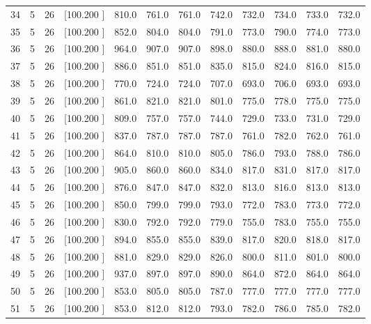 \documentclass[12pt,a4paper]{article}
\begin{document}
\begin{center}
{\begin{tabular}{r r r r r r r r r r r r}
  34&  5& 26&[100.200   ]&   810.0&   761.0&   761.0&   742.0&   732.0&   734.0&   733.0&   732.0\\[-0.02in]
  35&  5& 26&[100.200   ]&   852.0&   804.0&   804.0&   791.0&   773.0&   790.0&   774.0&   773.0\\[-0.02in]
  36&  5& 26&[100.200   ]&   964.0&   907.0&   907.0&   898.0&   880.0&   888.0&   881.0&   880.0\\[-0.02in]
  37&  5& 26&[100.200   ]&   886.0&   851.0&   851.0&   835.0&   815.0&   824.0&   816.0&   815.0\\[-0.02in]
  38&  5& 26&[100.200   ]&   770.0&   724.0&   724.0&   707.0&   693.0&   706.0&   693.0&   693.0\\[-0.02in]
  39&  5& 26&[100.200   ]&   861.0&   821.0&   821.0&   801.0&   775.0&   778.0&   775.0&   775.0\\[-0.02in]
  40&  5& 26&[100.200   ]&   809.0&   757.0&   757.0&   744.0&   729.0&   733.0&   731.0&   729.0\\[-0.02in]
  41&  5& 26&[100.200   ]&   837.0&   787.0&   787.0&   787.0&   761.0&   782.0&   762.0&   761.0\\[-0.02in]
  42&  5& 26&[100.200   ]&   864.0&   810.0&   810.0&   805.0&   786.0&   793.0&   788.0&   786.0\\[-0.02in]
  43&  5& 26&[100.200   ]&   905.0&   860.0&   860.0&   834.0&   817.0&   831.0&   817.0&   817.0\\[-0.02in]
  44&  5& 26&[100.200   ]&   876.0&   847.0&   847.0&   832.0&   813.0&   816.0&   813.0&   813.0\\[-0.02in]
  45&  5& 26&[100.200   ]&   850.0&   799.0&   799.0&   793.0&   772.0&   783.0&   773.0&   772.0\\[-0.02in]
  46&  5& 26&[100.200   ]&   830.0&   792.0&   792.0&   779.0&   755.0&   783.0&   755.0&   755.0\\[-0.02in]
  47&  5& 26&[100.200   ]&   894.0&   855.0&   855.0&   839.0&   817.0&   820.0&   818.0&   817.0\\[-0.02in]
  48&  5& 26&[100.200   ]&   881.0&   829.0&   829.0&   826.0&   800.0&   811.0&   801.0&   800.0\\[-0.02in]
  49&  5& 26&[100.200   ]&   937.0&   897.0&   897.0&   890.0&   864.0&   872.0&   864.0&   864.0\\[-0.02in]
  50&  5& 26&[100.200   ]&   853.0&   805.0&   805.0&   787.0&   777.0&   777.0&   777.0&   777.0\\[-0.02in]
  51&  5& 26&[100.200   ]&   853.0&   812.0&   812.0&   793.0&   782.0&   786.0&   785.0&   782.0\\[-0.02in]

\end{tabular}}
\end{center}
\end{document}
